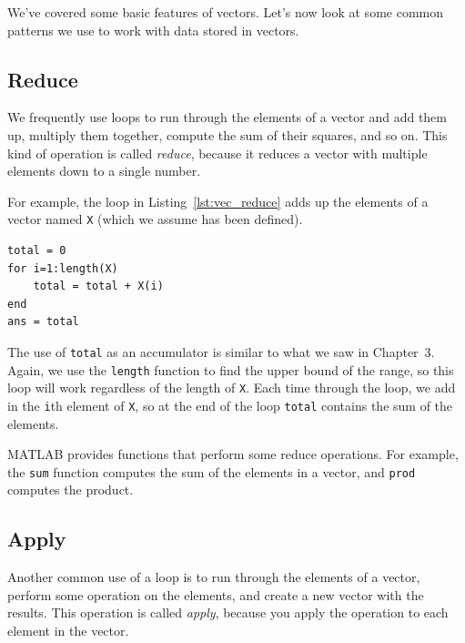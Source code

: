 We've covered some basic features of vectors. Let's now look at some common patterns we use to work with data stored in vectors.

\subsection{Reduce}
\label{reduce}

We frequently use loops to run through the elements of a vector
and add them up, multiply them together, compute the sum
of their squares, and so on.  This kind of operation is called \emph{reduce},
because it reduces a vector with multiple elements down to a single
number.


For example, the loop in Listing~\ref{lst:vec_reduce} adds up the elements of a vector named \lstinline{X} (which we assume has been defined).

\begin{lstlisting}[caption={Reducing a vector to a single scalar value (the sum)}, label={lst:vec_reduce}]
total = 0
for i=1:length(X)
    total = total + X(i)
end
ans = total
\end{lstlisting}

The use of \lstinline{total} as an accumulator is similar to what we
saw in Chapter~3.  Again, we use the \lstinline{length} function
to find the upper bound of the range, so this loop will work
regardless of the length of \lstinline{X}.
Each time through the loop, we add
in the \lstinline{i}th element of \lstinline{X}, so at the end of the loop
\lstinline{total} contains the sum of the elements.


MATLAB provides functions that perform some reduce operations.
For example, the \lstinline{sum} function computes the sum of the elements
in a vector, and \lstinline{prod} computes the product.


\subsection{Apply}
\label{apply}

Another common use of a loop is to run through the elements of
a vector, perform some operation on the elements, and create
a new vector with the results.  This operation is called
\emph{apply}, because you apply the operation to each element in
the vector.

